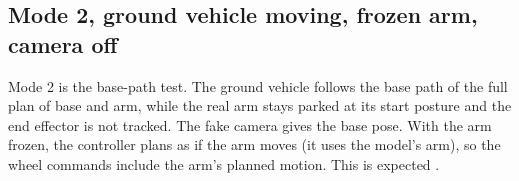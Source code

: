 \documentclass[11pt]{article}
\newif\ifshowsrc
\newcommand{\src}[1]{\ifshowsrc{\scriptsize\,[\texttt{\romecode{#1}}]}\fi}
\begin{document}
\subsection*{Mode 2, ground vehicle moving, frozen arm, camera off}\label{sec:mode2}
Mode 2 is the base-path test. The ground vehicle follows the base path of the full plan of base
and arm, while the real arm stays parked at its start posture and the end effector is not tracked.
The fake camera gives the base pose. With the arm frozen, the controller plans as if the arm moves
(it uses the model's arm), so the wheel commands include the arm's planned motion. This is expected
\src{tools/wire_motive_emulator.m:70; tests/test_motive_emulator.m:61-62}.
\end{document}

